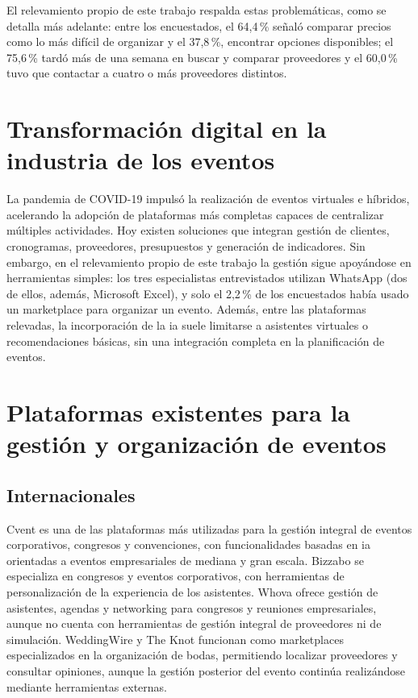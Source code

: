 El relevamiento propio de este trabajo respalda estas problemáticas,
como se detalla más adelante: entre los encuestados, el 64,4\,\% señaló
comparar precios como lo más difícil de organizar y el 37,8\,\%,
encontrar opciones disponibles; el 75,6\,\% tardó más de una semana en
buscar y comparar proveedores y el 60,0\,\% tuvo que contactar a cuatro
o más proveedores distintos.

\section{Transformación digital en la industria de los eventos}

La pandemia de COVID-19 impulsó la realización de eventos virtuales e
híbridos, acelerando la adopción de plataformas más completas capaces de
centralizar múltiples actividades. Hoy existen soluciones que integran
gestión de clientes, cronogramas, proveedores, presupuestos y generación
de indicadores. Sin embargo, en el relevamiento propio de este trabajo
la gestión sigue apoyándose en herramientas simples: los tres
especialistas entrevistados utilizan WhatsApp (dos de ellos, además, Microsoft
Excel), y solo
el 2,2\,\% de los encuestados había usado un marketplace para organizar
un evento. Además, entre las plataformas relevadas, la incorporación de
la \gls{ia} suele limitarse a asistentes virtuales o recomendaciones
básicas, sin una integración completa en la planificación de eventos.

\section{Plataformas existentes para la gestión y organización de eventos}\label{sec:plataformas-existentes}

\subsection{Internacionales}

Cvent \citep{cvent} es una de las plataformas más utilizadas para la
gestión integral de eventos corporativos, congresos y convenciones, con
funcionalidades basadas en \gls{ia} orientadas a eventos empresariales de
mediana y gran escala. Bizzabo \citep{bizzabo} se especializa en
congresos y eventos corporativos, con herramientas de personalización de
la experiencia de los asistentes.
Whova \citep{whova} ofrece gestión de asistentes, agendas y networking para congresos y
reuniones empresariales, aunque no cuenta con herramientas de gestión
integral de proveedores ni de simulación. WeddingWire \citep{weddingwire}
y The Knot \citep{theknot} funcionan como marketplaces especializados en
la organización de bodas,
permitiendo localizar proveedores y consultar opiniones, aunque la
gestión posterior del evento continúa realizándose mediante herramientas
externas.

